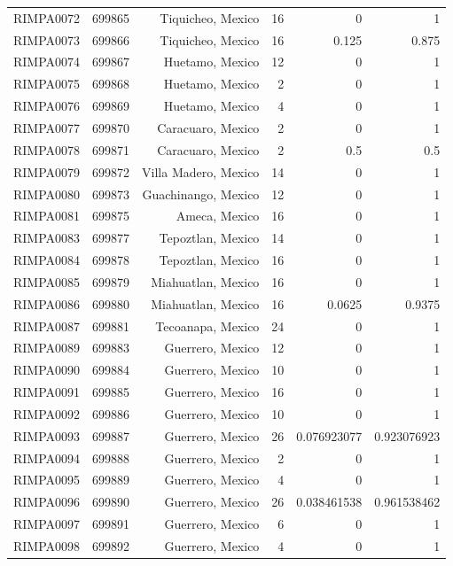 \documentclass[11pt]{article}
\begin{document}
\begin{linenumbers}
\begin{flushleft}
\begin{table}[htbp]
\begin{tabular}{rrrrrr}
    RIMPA0072 & 699865 & Tiquicheo, Mexico & 16    & 0     & 1 \\
    RIMPA0073 & 699866 & Tiquicheo, Mexico & 16    & 0.125 & 0.875 \\
    RIMPA0074 & 699867 & Huetamo, Mexico & 12    & 0     & 1 \\
    RIMPA0075 & 699868 & Huetamo, Mexico & 2     & 0     & 1 \\
    RIMPA0076 & 699869 & Huetamo, Mexico & 4     & 0     & 1 \\
    RIMPA0077 & 699870 & Caracuaro, Mexico & 2     & 0     & 1 \\
    RIMPA0078 & 699871 & Caracuaro, Mexico & 2     & 0.5   & 0.5 \\
    RIMPA0079 & 699872 & Villa Madero, Mexico & 14    & 0     & 1 \\
    RIMPA0080 & 699873 & Guachinango, Mexico & 12    & 0     & 1 \\
    RIMPA0081 & 699875 & Ameca, Mexico & 16    & 0     & 1 \\
    RIMPA0083 & 699877 & Tepoztlan, Mexico & 14    & 0     & 1 \\
    RIMPA0084 & 699878 & Tepoztlan, Mexico & 16    & 0     & 1 \\
    RIMPA0085 & 699879 & Miahuatlan, Mexico & 16    & 0     & 1 \\
    RIMPA0086 & 699880 & Miahuatlan, Mexico & 16    & 0.0625 & 0.9375 \\
    RIMPA0087 & 699881 & Tecoanapa, Mexico & 24    & 0     & 1 \\
    RIMPA0089 & 699883 & Guerrero, Mexico & 12    & 0     & 1 \\
    RIMPA0090 & 699884 & Guerrero, Mexico & 10    & 0     & 1 \\
    RIMPA0091 & 699885 & Guerrero, Mexico & 16    & 0     & 1 \\
    RIMPA0092 & 699886 & Guerrero, Mexico & 10    & 0     & 1 \\
    RIMPA0093 & 699887 & Guerrero, Mexico & 26    & 0.076923077 & 0.923076923 \\
    RIMPA0094 & 699888 & Guerrero, Mexico & 2     & 0     & 1 \\
    RIMPA0095 & 699889 & Guerrero, Mexico & 4     & 0     & 1 \\
    RIMPA0096 & 699890 & Guerrero, Mexico & 26    & 0.038461538 & 0.961538462 \\
    RIMPA0097 & 699891 & Guerrero, Mexico & 6     & 0     & 1 \\
    RIMPA0098 & 699892 & Guerrero, Mexico & 4     & 0     & 1 \\

\end{tabular}
\end{table}
\end{flushleft}
\end{linenumbers}
\end{document}
